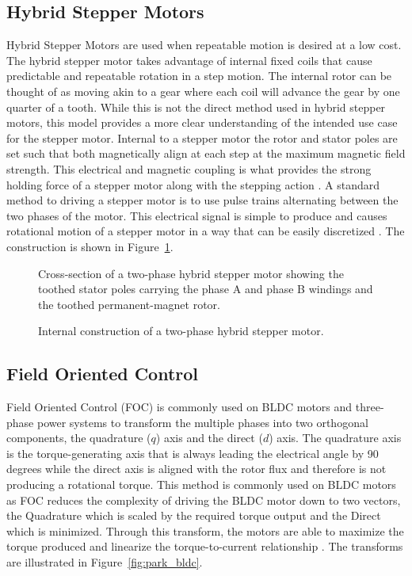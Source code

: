 \subsection{Hybrid Stepper Motors}\label{hybridStepperMotor}
Hybrid Stepper Motors are used when repeatable motion is desired at a low cost. The hybrid stepper motor takes advantage of internal fixed coils that cause predictable and repeatable rotation in a step motion. The internal rotor can be thought of as moving akin to a gear where each coil will advance the gear by one quarter of a tooth. While this is not the direct method used in hybrid stepper motors, this model provides a more clear understanding of the intended use case for the stepper motor. Internal to a stepper motor the rotor and stator poles are set such that both magnetically align at each step at the maximum magnetic field strength. This electrical and magnetic coupling is what provides the strong holding force of a stepper motor along with the stepping action \cite{henke_modeling_2013,binfet_implementation_2026,derammelaere_linear_2010}. A standard method to driving a stepper motor is to use pulse trains alternating between the two phases of the motor. This electrical signal is simple to produce and causes rotational motion of a stepper motor in a way that can be easily discretized \cite{ricci_simple_2018,lai_modelling_2018}. The construction is shown in Figure~\ref{fig:hybrid_stepper}. 

\begin{figure}[htbp]
	\centering
		{Cross-section of a two-phase hybrid stepper motor showing the toothed stator poles carrying the phase A and phase B windings and the toothed permanent-magnet rotor.}
	\caption[Hybrid stepper motor construction]{Internal construction of a two-phase hybrid stepper motor.}
	\label{fig:hybrid_stepper}
\end{figure}

\subsection{Field Oriented Control}\label{FOC}
Field Oriented Control (FOC) is commonly used on BLDC motors and three-phase power systems to transform the multiple phases into two orthogonal components, the quadrature ($q$) axis and the direct ($d$) axis. The quadrature axis is the torque-generating axis that is always leading the electrical angle by 90 degrees while the direct axis is aligned with the rotor flux and therefore is not producing a rotational torque. This method is commonly used on BLDC motors as FOC reduces the complexity of driving the BLDC motor down to two vectors, the Quadrature which is scaled by the required torque output and the Direct which is minimized. Through this transform, the motors are able to maximize the torque produced and linearize the torque-to-current relationship \cite{benchaib_discrete-time_2003,nilsson_universal_2013,binfet_implementation_2026}. The transforms are illustrated in Figure~\ref{fig:park_bldc}.

